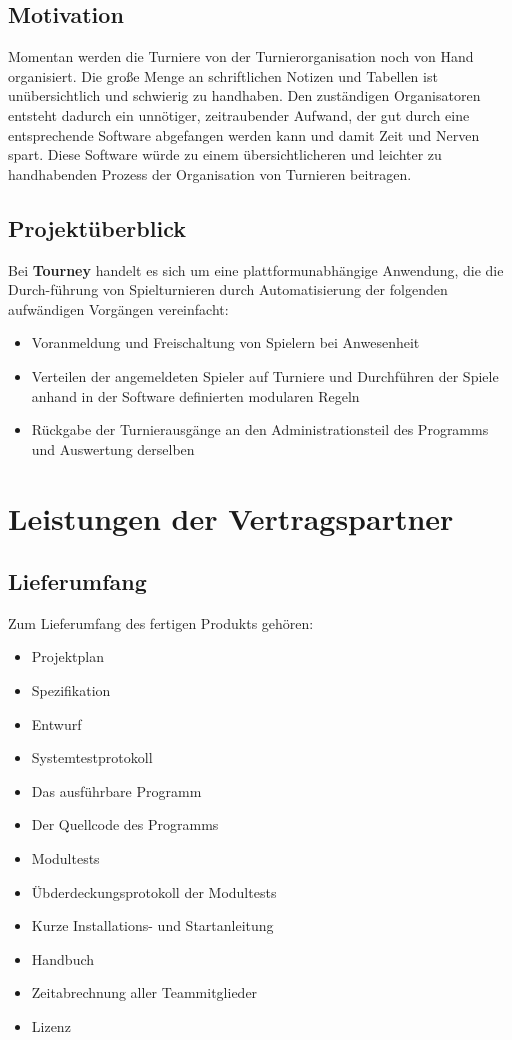 \documentclass[11pt]{article}
\begin{document}
\subsection{Motivation}

Momentan werden die Turniere von der Turnierorganisation noch von Hand organisiert. Die große Menge an schriftlichen Notizen und Tabellen ist unübersichtlich und schwierig zu handhaben. Den zuständigen Organisatoren entsteht dadurch ein unnötiger, zeitraubender Aufwand, der gut durch eine entsprechende Software abgefangen werden kann und damit Zeit und Nerven spart. Diese Software würde zu einem übersichtlicheren und leichter zu handhabenden Prozess der Organisation von Turnieren beitragen.

\subsection{Projektüberblick}

Bei \textbf{Tourney} handelt es sich um eine plattformunabhängige Anwendung, die die Durch-führung von Spielturnieren durch Automatisierung der folgenden aufwändigen Vorgängen vereinfacht:
\begin{itemize}
	\item Voranmeldung und Freischaltung von Spielern bei Anwesenheit
	\item Verteilen der angemeldeten Spieler auf Turniere und Durchführen der Spiele anhand in der Software definierten modularen Regeln
	\item Rückgabe der Turnierausgänge an den Administrationsteil des Programms und Auswertung derselben
\end{itemize}

\newpage

\section{Leistungen der Vertragspartner}

\subsection{Lieferumfang}

Zum Lieferumfang des fertigen Produkts gehören:

\begin{itemize}
	\item Projektplan
	\item Spezifikation
	\item Entwurf
	\item Systemtestprotokoll
	\item Das ausführbare Programm
	\item Der Quellcode des Programms
	\item Modultests
	\item Übderdeckungsprotokoll der Modultests
	\item Kurze Installations- und Startanleitung
	\item Handbuch
	\item Zeitabrechnung aller Teammitglieder
	\item Lizenz
\end{itemize}
\end{document}
